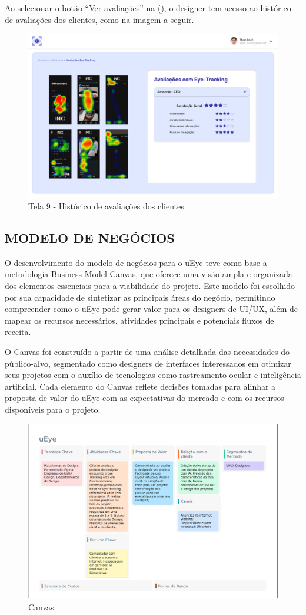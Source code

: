 Ao selecionar o botão “Ver avaliações” na (), o designer tem acesso ao histórico de avaliações dos clientes, como na imagem a seguir.

\begin{figure}[H]
    \centering
    \caption{Tela 9 - Histórico de avaliações dos clientes}%
    \label{fig:pg-tela9}
    \includegraphics[width=0.72\linewidth]{Illustrations/tela9.png}
\end{figure}

\subsection*{MODELO DE NEGÓCIOS}
O desenvolvimento do modelo de negócios para o uEye teve como base a metodologia Business Model Canvas, que oferece uma visão ampla e organizada dos elementos essenciais para a viabilidade do projeto. Este modelo foi escolhido por sua capacidade de sintetizar as principais áreas do negócio, permitindo compreender como o uEye pode gerar valor para os designers de UI/UX, além de mapear os recursos necessários, atividades principais e potenciais fluxos de receita.

O Canvas foi construído a partir de uma análise detalhada das necessidades do público-alvo, segmentado como designers de interfaces interessados em otimizar seus projetos com o auxílio de tecnologias como rastreamento ocular e inteligência artificial. Cada elemento do Canvas reflete decisões tomadas para alinhar a proposta de valor do uEye com as expectativas do mercado e com os recursos disponíveis para o projeto.

\begin{figure}[H]
    \centering
    \caption{Canvas}%
    \label{fig:pg-canvas1}
    \includegraphics[width=0.72\linewidth]{Illustrations/canvas1.png}
\end{figure}

